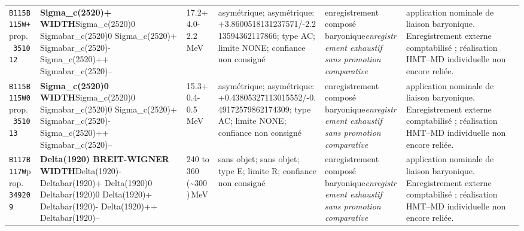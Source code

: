 \begin{landscape}
\begin{longtable}{L{1.85cm}L{4.45cm}L{2.35cm}L{4.05cm}L{3.35cm}L{7.15cm}}
\texttt{B115}\newline \texttt{B115W+}\newline prop.\ \texttt{351012} & \textbf{Sigma\_\allowbreak{}c(2520)+ WIDTH}\newline Sigma\_\allowbreak{}c(2520)0 \textbar{}\allowbreak{} Sigmabar\_\allowbreak{}c(2520)0 \textbar{}\allowbreak{} Sigma\_\allowbreak{}c(2520)+ \textbar{}\allowbreak{} Sigmabar\_\allowbreak{}c(2520)- \textbar{}\allowbreak{} Sigma\_\allowbreak{}c(2520)++ \textbar{}\allowbreak{} Sigmabar\_\allowbreak{}c(2520)-- & 17.2+4.0-2.2\,MeV & asymétrique; asymétrique: +3.8600518131237571/-2.213594362117866; type AC; limite NONE; confiance non consigné & enregistrement composé baryonique\newline \emph{enregistrement exhaustif sans promotion comparative} & application nominale de liaison baryonique. Enregistrement externe comptabilisé ; réalisation HMT--MD individuelle non encore reliée. \\
\texttt{B115}\newline \texttt{B115W0}\newline prop.\ \texttt{351013} & \textbf{Sigma\_\allowbreak{}c(2520)0 WIDTH}\newline Sigma\_\allowbreak{}c(2520)0 \textbar{}\allowbreak{} Sigmabar\_\allowbreak{}c(2520)0 \textbar{}\allowbreak{} Sigma\_\allowbreak{}c(2520)+ \textbar{}\allowbreak{} Sigmabar\_\allowbreak{}c(2520)- \textbar{}\allowbreak{} Sigma\_\allowbreak{}c(2520)++ \textbar{}\allowbreak{} Sigmabar\_\allowbreak{}c(2520)-- & 15.3+0.4-0.5\,MeV & asymétrique; asymétrique: +0.43805327113015552/-0.49172579862174309; type AC; limite NONE; confiance non consigné & enregistrement composé baryonique\newline \emph{enregistrement exhaustif sans promotion comparative} & application nominale de liaison baryonique. Enregistrement externe comptabilisé ; réalisation HMT--MD individuelle non encore reliée. \\
\texttt{B117}\newline \texttt{B117W}\newline prop.\ \texttt{349209} & \textbf{Delta(1920) BREIT-WIGNER WIDTH}\newline Delta(1920)- \textbar{}\allowbreak{} Deltabar(1920)+ \textbar{}\allowbreak{} Delta(1920)0 \textbar{}\allowbreak{} Deltabar(1920)0 \textbar{}\allowbreak{} Delta(1920)+ \textbar{}\allowbreak{} Deltabar(1920)- \textbar{}\allowbreak{} Delta(1920)++ \textbar{}\allowbreak{} Deltabar(1920)-- & 240 to 360 (\textasciitilde{}300)\,MeV & sans objet; sans objet; type E; limite R; confiance non consigné & enregistrement composé baryonique\newline \emph{enregistrement exhaustif sans promotion comparative} & application nominale de liaison baryonique. Enregistrement externe comptabilisé ; réalisation HMT--MD individuelle non encore reliée. \\

\end{longtable}
\end{landscape}
